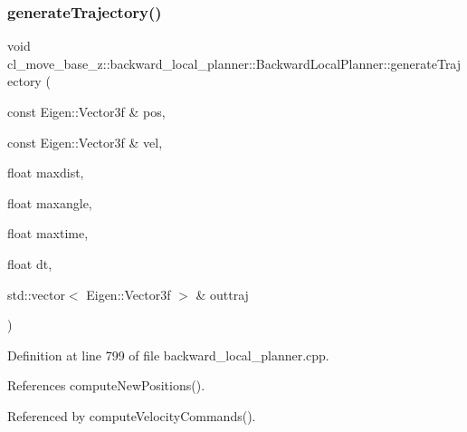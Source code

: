 \subsubsection{\texorpdfstring{generate\+Trajectory()}{generateTrajectory()}}
{\footnotesize\ttfamily void cl\+\_\+move\+\_\+base\+\_\+z\+::backward\+\_\+local\+\_\+planner\+::\+Backward\+Local\+Planner\+::generate\+Trajectory (\begin{DoxyParamCaption}\item[{const Eigen\+::\+Vector3f \&}]{pos,  }\item[{const Eigen\+::\+Vector3f \&}]{vel,  }\item[{float}]{maxdist,  }\item[{float}]{maxangle,  }\item[{float}]{maxtime,  }\item[{float}]{dt,  }\item[{std\+::vector$<$ Eigen\+::\+Vector3f $>$ \&}]{outtraj }\end{DoxyParamCaption})\hspace{0.3cm}{\ttfamily [private]}}



Definition at line 799 of file backward\+\_\+local\+\_\+planner.\+cpp.



References compute\+New\+Positions().



Referenced by compute\+Velocity\+Commands().


